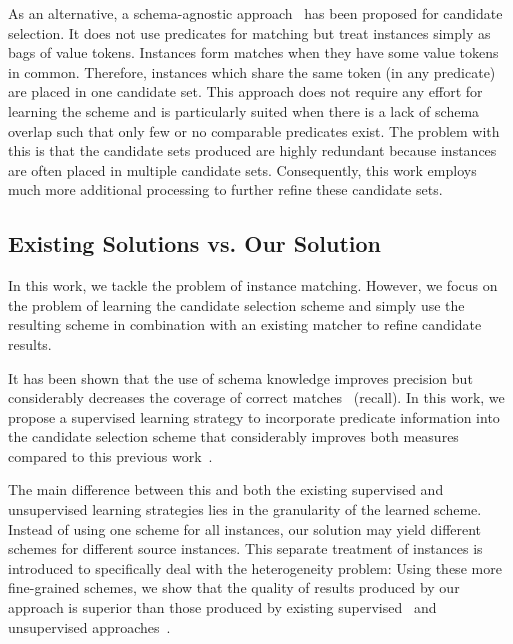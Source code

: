 As an alternative, a schema-agnostic approach~\cite{DBLP:conf/wsdm/PapadakisINF11} has been proposed for candidate selection. It does not use predicates for matching but treat instances simply as bags of value tokens. Instances form matches when they have some value tokens in common. Therefore, instances which share the same token (in any predicate) are placed in one candidate set. This approach does not require any effort for learning the scheme and is particularly suited when there is a lack of schema overlap such that only few or no comparable predicates exist. The problem with this is that the candidate sets produced are highly redundant because instances are often placed in multiple candidate sets. Consequently, this work employs much more additional processing to further refine these candidate sets. 


\subsection{Existing Solutions vs. Our Solution}
In this work, we tackle the problem of instance matching. However, we focus on the problem of learning the candidate selection scheme and simply use the resulting scheme in combination with an existing matcher to refine candidate results. 

It has been shown that the use of schema knowledge improves precision but considerably decreases the coverage of correct matches~\cite{DBLP:conf/wsdm/PapadakisINF11} (recall). In this work, we propose a supervised learning strategy to incorporate predicate information into the candidate selection scheme that considerably improves both measures compared to this previous work~\cite{}. 

The main difference between this and both the existing supervised and unsupervised learning strategies lies in the granularity of the learned scheme. Instead of using one scheme for all instances, our solution may yield different schemes for different source instances. This separate treatment of instances is introduced to specifically deal with the heterogeneity problem:  Using these more fine-grained schemes, we show that the quality of results produced by our approach is superior than those produced by existing supervised~\cite{DBLP:conf/vldb/ChaudhuriCGK07} and unsupervised approaches~\cite{DBLP:conf/semweb/SongH11}. 

